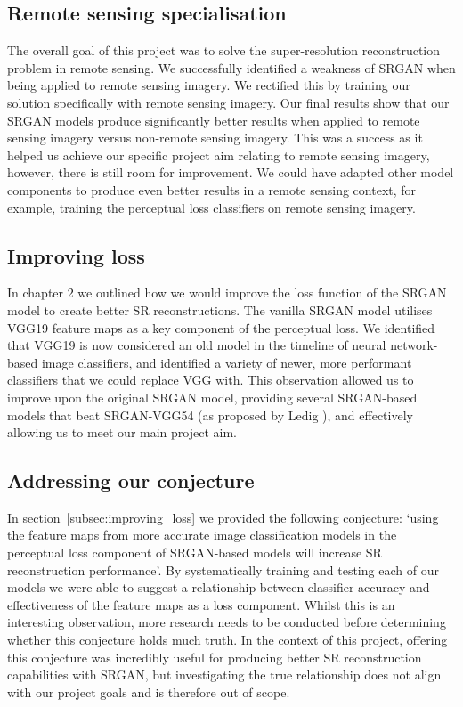 \subsection{Remote sensing specialisation}
The overall goal of this project was to solve the super-resolution reconstruction problem in remote sensing. We successfully identified a weakness of SRGAN when being applied to remote sensing imagery. We rectified this by training our solution specifically with remote sensing imagery. Our final results show that our SRGAN models produce significantly better results when applied to remote sensing imagery versus non-remote sensing imagery. This was a success as it helped us achieve our specific project aim relating to remote sensing imagery, however, there is still room for improvement. We could have adapted other model components to produce even better results in a remote sensing context, for example, training the perceptual loss classifiers on remote sensing imagery.

\subsection{Improving loss}
In chapter 2 we outlined how we would improve the loss function of the SRGAN model to create better SR reconstructions. The vanilla SRGAN model utilises VGG19 feature maps as a key component of the perceptual loss. We identified that VGG19 is now considered an old model in the timeline of neural network-based image classifiers, and identified a variety of newer, more performant classifiers that we could replace VGG with. This observation allowed us to improve upon the original SRGAN model, providing several SRGAN-based models that beat SRGAN-VGG54 (as proposed by Ledig \etal), and effectively allowing us to meet our main project aim.

\subsection{Addressing our conjecture}
In section~\ref{subsec:improving_loss} we provided the following conjecture: `using the feature maps from more accurate image classification models in the perceptual loss component of SRGAN-based models will increase SR reconstruction performance'. By systematically training and testing each of our models we were able to suggest a relationship between classifier accuracy and effectiveness of the feature maps as a loss component. Whilst this is an interesting observation, more research needs to be conducted before determining whether this conjecture holds much truth. In the context of this project, offering this conjecture was incredibly useful for producing better SR reconstruction capabilities with SRGAN, but investigating the true relationship does not align with our project goals and is therefore out of scope.


